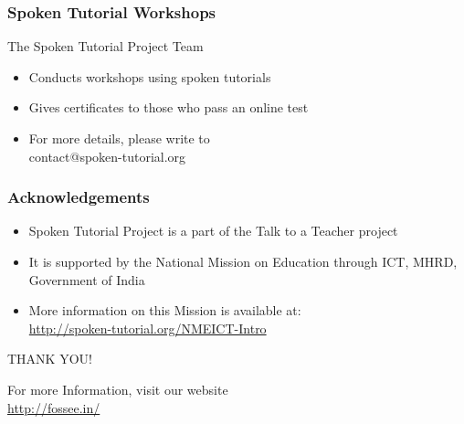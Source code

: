 \documentclass[17pt,compress]{beamer}
\begin{document}
\begin{frame}
\frametitle{Spoken Tutorial Workshops}The Spoken Tutorial Project Team 
\begin{itemize}
\item Conducts workshops using spoken tutorials 
\item Gives certificates to those who pass an online test 
\item For more details, please write to \\ \hspace {0.5cm}
{\color{blue}contact@spoken-tutorial.org}
\end{itemize}
\end{frame}

\begin{frame}
\frametitle{Acknowledgements}
\begin{itemize}
\item Spoken Tutorial Project is a part of the Talk to a Teacher  project 
\item It is supported by the National Mission on Education through  ICT, MHRD, 
Government of India 
\item More information on this Mission is available at: \\
{\color{blue}\url{http://spoken-tutorial.org/NMEICT-Intro}}
\end{itemize}
\end{frame}

\begin{frame}
  \begin{block}{}
  \begin{center}
  {\Large THANK YOU!} 
  \end{center}
  \end{block}
\begin{block}{}
  \begin{center}
    For more Information, visit our website\\
    {\color{blue}\url{http://fossee.in/}}
  \end{center}  
  \end{block}
\end{frame}
\end{document}
